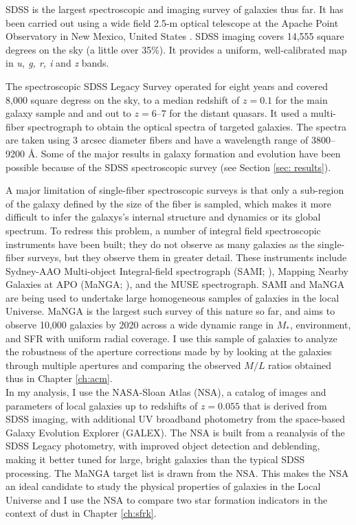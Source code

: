 SDSS is the largest spectroscopic and imaging survey of galaxies thus
far. It has been carried out using a wide field 2.5-m optical
telescope at the Apache Point Observatory \citet{2006AJ....131.2332G}
in New Mexico, United States \citep{2000AJ....120.1579Y,
  2002AJ....124.1810S}. SDSS imaging covers 14,555 square degrees on
the sky (a little over 35\%).  It provides a uniform, well-calibrated
map in \emph{u, g, r, i} and \emph{z} bands.

The spectroscopic SDSS Legacy Survey operated for eight years and
covered 8,000 square degress on the sky, to a median redshift of $z=
0.1$ for the main galaxy sample and and out to $z = 6$--$7$ for the
distant quasars.  It used a multi-fiber spectrograph
\citep{smee_multi-object_2013} to obtain the optical spectra of
targeted galaxies. The spectra are taken using 3 arcsec diameter
fibers and have a wavelength range of 3800--9200 \AA. Some of the
major results in galaxy formation and evolution have been possible
because of the SDSS spectroscopic survey (see Section \ref{sec:
  results}).

A major limitation of single-fiber spectroscopic surveys is that only
a sub-region of the galaxy defined by the size of the fiber is
sampled, which makes it more difficult to infer the galaxys's internal
structure and dynamics or its global spectrum. To redress this
problem, a number of integral field spectroscopic instruments have
been built; they do not observe as many galaxies as the single-fiber
surveys, but they observe them in greater detail. These instruments
include Sydney-AAO Multi-object Integral-field spectrograph (SAMI;
\citealt{bryant_sami_2015}), Mapping Nearby Galaxies at APO (MaNGA;
\citealt{bundy_overview_2014}), and the MUSE spectrograph. SAMI and
MaNGA are being used to undertake large homogeneous samples of
galaxies in the local Universe.  MaNGA is the largest such survey of
this nature so far, and aims to observe 10,000 galaxies by 2020 across
a wide dynamic range in $M_{*}$, environment, and SFR with uniform
radial coverage.  I use this sample of galaxies to analyze the
robustness of the aperture corrections made by
\citet{kauffmann_environmental_2004} by looking at the galaxies
through multiple apertures and comparing the observed $M/L$ ratios
obtained thus in Chapter \ref{ch:acm}.\\

In my analysis, I use the NASA-Sloan Atlas (NSA), a catalog of images
and parameters of local galaxies up to redshifts of $z = 0.055$ that
is derived from SDSS imaging, with additional UV broadband photometry
from the space-based Galaxy Evolution Explorer (GALEX). The NSA is
built from a reanalysis \citet{2011AJ....142...31B} of the SDSS Legacy
photometry, with improved object detection and deblending, making it
better tuned for large, bright galaxies than the typical SDSS
processing. The MaNGA target list is drawn from the NSA. This makes
the NSA an ideal candidate to study the physical properties of
galaxies in the Local Universe and I use the NSA to compare two star
formation indicators in the context of dust in Chapter
\ref{ch:sfrk}.\\

